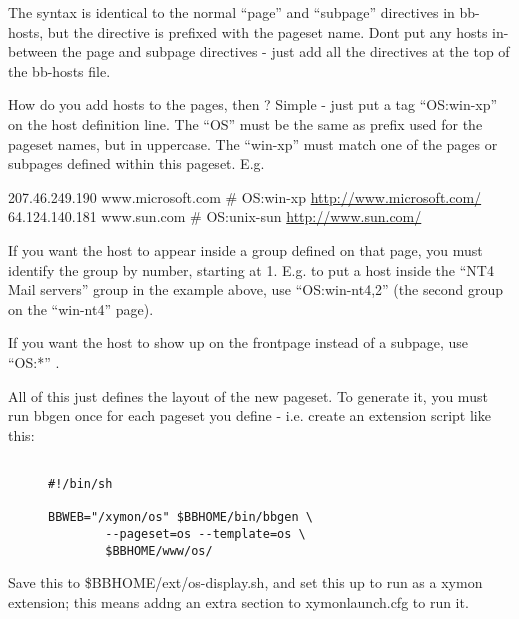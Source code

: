  The syntax is identical to the normal ``page'' and ``subpage''
 directives in bb-hosts, but the directive is prefixed with the
 pageset name. Dont put any hosts in-between the page and subpage
 directives - just add all the directives at the top of the bb-hosts
 file.  

 How do you add hosts to the pages, then ? Simple - just put a tag
 ``OS:win-xp'' on the host definition line. The ``OS'' must be the
 same as prefix used for the pageset names, but in uppercase. The
 ``win-xp'' must match one of the pages or subpages defined within
 this pageset. E.g. 



  207.46.249.190 www.microsoft.com \# OS:win-xp \url{http://www.microsoft.com/} 
 64.124.140.181 www.sun.com \# OS:unix-sun \url{http://www.sun.com/}


  If you want the host to appear inside a group defined on that page,
  you must identify the group by number, starting at 1. E.g. to put a
  host inside the ``NT4 Mail servers'' group in the example above, use
  ``OS:win-nt4,2'' (the second group on the ``win-nt4'' page).  

 If you want the host to show up on the frontpage instead of a subpage, use ``OS:*'' . 


  All of this just defines the layout of the new pageset. To generate
  it, you must run bbgen once for each pageset you define -
  i.e. create an extension script like this: \begin{description}

\item[]\begin{verbatim}

#!/bin/sh

BBWEB="/xymon/os" $BBHOME/bin/bbgen \
        --pageset=os --template=os \
        $BBHOME/www/os/

\end{verbatim}


\end{description}



  Save this to \$BBHOME/ext/os-display.sh, and set this up to run as a
  xymon extension; this means addng an extra section to
  xymonlaunch.cfg to run it. 



